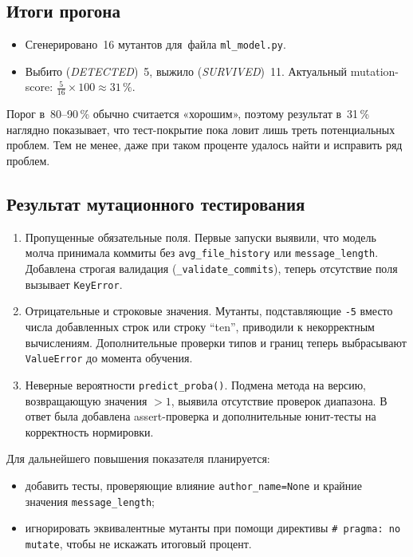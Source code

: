 \vspace{0.7em}
\subsection{Итоги прогона}

\begin{itemize}
	\item Сгенерировано~16 мутантов для~файла \texttt{ml\_model.py}.
	\item Выбито (\textit{DETECTED})~5, выжило (\textit{SURVIVED})~11.  
	Актуальный mutation-score: $\frac{5}{16}\!\times\!100 \approx 31\,\%$.
\end{itemize}

Порог в~80--90\,\% обычно считается «хорошим»,
поэтому результат в~31\,\% наглядно показывает,
что тест-покрытие пока ловит лишь треть потенциальных проблем.
Тем не менее, даже при таком проценте удалось найти и исправить ряд проблем.

\vspace{0.7em}
\subsection{Результат мутационного тестирования}

\begin{enumerate}
	\item Пропущенные обязательные поля.
	Первые запуски выявили, что модель молча принимала коммиты без
	\verb|avg_file_history| или \verb|message_length|.  
	Добавлена строгая валидация (\verb|_validate_commits|),
	теперь отсутствие поля вызывает \verb|KeyError|.
	
	\item Отрицательные и строковые значения.
	Мутанты, подставляющие \verb|-5| вместо числа добавленных строк
	или строку ``ten'', приводили к некорректным вычислениям.
	Дополнительные проверки типов и границ теперь
	выбрасывают \verb|ValueError| до момента обучения.
	
	\item Неверные вероятности \texttt{predict\_proba()}.
	Подмена метода на версию, возвращающую значения $>1$,
	выявила отсутствие проверок диапазона.  
	В ответ была добавлена assert-проверка и дополнительные
	юнит-тесты на корректность нормировки.
\end{enumerate}

Для дальнейшего повышения показателя планируется:

\begin{itemize}
	\item добавить тесты, проверяющие влияние
	\verb|author_name=None| и крайние значения \verb|message_length|;
	\item игнорировать эквивалентные мутанты при помощи директивы
	\texttt{\# pragma: no mutate}, чтобы не искажать итоговый процент.
\end{itemize}

